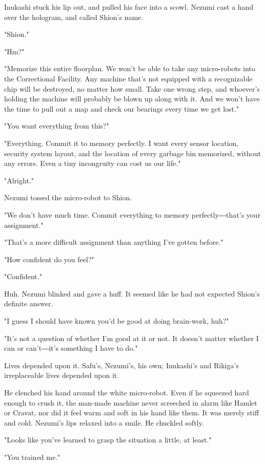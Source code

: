 Inukashi stuck his lip out, and pulled his face into a scowl. Nezumi
cast a hand over the hologram, and called Shion's name.

"Shion."

"Hm?"

"Memorize this entire floorplan. We won't be able to take any
micro-robots into the Correctional Facility. Any machine that's not
equipped with a recognizable chip will be destroyed, no matter how
small. Take one wrong step, and whoever's holding the machine will
probably be blown up along with it. And we won't have the time to pull
out a map and check our bearings every time we get lost."

"You want everything from this?"

"Everything. Commit it to memory perfectly. I want every sensor
location, security system layout, and the location of every garbage bin
memorized, without any errors. Even a tiny incongruity can cost us our
life."

"Alright."

Nezumi tossed the micro-robot to Shion.

"We don't have much time. Commit everything to memory perfectly―that's
your assignment."

"That's a more difficult assignment than anything I've gotten before."

"How confident do you feel?"

"Confident."

Huh. Nezumi blinked and gave a huff. It seemed like he had not expected
Shion's definite answer.

"I guess I should have known you'd be good at doing brain-work, huh?"

"It's not a question of whether I'm good at it or not. It doesn't matter
whether I can or can't―it's something I have to do."

Lives depended upon it. Safu's, Nezumi's, his own; Inukashi's and
Rikiga's irreplaceable lives depended upon it.

He clenched his hand around the white micro-robot. Even if he squeezed
hard enough to crush it, the man-made machine never screeched in alarm
like Hamlet or Cravat, nor did it feel warm and soft in his hand like
them. It was merely stiff and cold. Nezumi's lips relaxed into a smile.
He chuckled softly.

"Looks like you've learned to grasp the situation a little, at least."

"You trained me."


